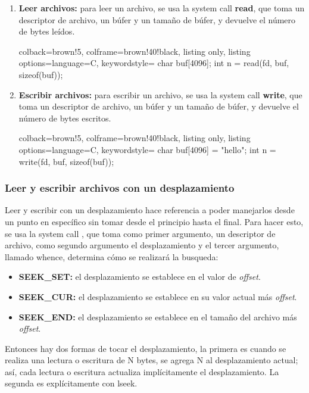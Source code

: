 \documentclass[openany]{book}
\begin{document}
\begin{enumerate}
    \item \textbf{Leer archivos:} para leer un archivo, se usa la system call \textbf{read}, que toma un descriptor de archivo, un búfer y un tamaño de búfer, y devuelve el número de bytes leídos.
    \begin{tcblisting}{colback=brown!5, colframe=brown!40!black, listing only, listing options={language=C, keywordstyle=\color{blue!35!white}\bfseries}}
    char buf[4096];
    int n = read(fd, buf, sizeof(buf));
    \end{tcblisting}
    \item \textbf{Escribir archivos:} para escribir un archivo, se usa la system call \textbf{write}, que toma un descriptor de archivo, un búfer y un tamaño de búfer, y devuelve el número de bytes escritos.
    \begin{tcblisting}{colback=brown!5, colframe=brown!40!black, listing only, listing options={language=C, keywordstyle=\color{blue!35!white}\bfseries}}
    char buf[4096] = "hello";
    int n = write(fd, buf, sizeof(buf));
    \end{tcblisting}
\end{enumerate}

\subsubsection{Leer y escribir archivos con un desplazamiento}
Leer y escribir con un desplazamiento hace referencia a poder manejarlos desde un punto en específico sin tomar desde el \colorbox{yellow!20}{principio hasta el final}. Para hacer esto, se usa la system call , que toma como primer argumento, un \colorbox{yellow!20}{descriptor de archivo}, como segundo argumento el \colorbox{yellow!20}{desplazamiento} y el tercer argumento, llamado \colorbox{yellow!20}{whence}, determina cómo se realizará la busqueda:
\begin{itemize}
    \item \textbf{SEEK\_SET:} el desplazamiento se establece en el valor de \textit{offset}.
    \item \textbf{SEEK\_CUR:} el desplazamiento se establece en su valor actual más \textit{offset}.
    \item \textbf{SEEK\_END:} el desplazamiento se establece en el tamaño del archivo más \textit{offset}.
\end{itemize}

Entonces hay dos formas de tocar el desplazamiento, la primera es cuando se realiza una lectura o escritura de N bytes, se agrega N al desplazamiento actual; así, cada lectura o escritura actualiza implícitamente el desplazamiento. La segunda es explícitamente con lseek.
\end{document}

